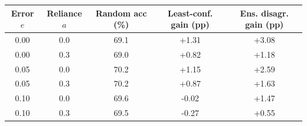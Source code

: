 \begin{tabular}{ccccc}
\toprule
Error $e$ & Reliance $a$ & Random acc (\%) & Least-conf. gain (pp) & Ens. disagr. gain (pp) \\
\midrule
0.00 & 0.0 & 69.1 & +1.31 & +3.08 \\
0.00 & 0.3 & 69.0 & +0.82 & +1.18 \\
0.05 & 0.0 & 70.2 & +1.15 & +2.59 \\
0.05 & 0.3 & 70.2 & +0.87 & +1.63 \\
0.10 & 0.0 & 69.6 & -0.02 & +1.47 \\
0.10 & 0.3 & 69.5 & -0.27 & +0.55 \\
\bottomrule
\end{tabular}
